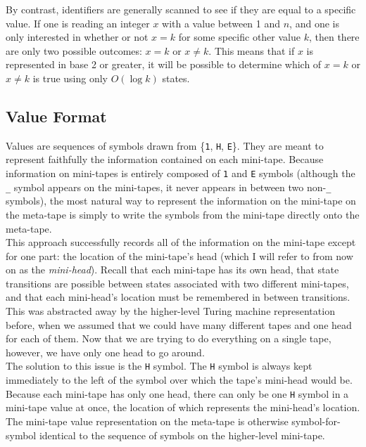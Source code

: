 \documentclass[11pt]{report}
\begin{document}
By contrast, identifiers are generally scanned to see if they are equal to a specific value. If one is reading an integer $x$ with a value between 1 and $n$, and one is only interested in whether or not $x = k$ for some specific other value $k$, then there are only two possible outcomes: $x = k$ or $x \not= k$. This means that if $x$ is represented in base 2 or greater, it will be possible to determine which of $x = k$ or $x \not= k$ is true using only $O(\log k)$ states. \\

\subsection{Value Format}

Values are sequences of symbols drawn from \{\texttt{1}, \texttt{H}, \texttt{E}\}. They are meant to represent faithfully the information contained on each mini-tape. Because information on mini-tapes is entirely composed of \texttt{1} and \texttt{E} symbols (although the \texttt{\_} symbol appears on the mini-tapes, it never appears in between two non-\texttt{\_} symbols), the most natural way to represent the information on the mini-tape on the meta-tape is simply to write the symbols from the mini-tape directly onto the meta-tape. \\

This approach successfully records all of the information on the mini-tape except for one part: the location of the mini-tape's head (which I will refer to from now on as the \emph{mini-head}). Recall that each mini-tape has its own head, that state transitions are possible between states associated with two different mini-tapes, and that each mini-head's location must be remembered in between transitions. This was abstracted away by the higher-level Turing machine representation before, when we assumed that we could have many different tapes and one head for each of them. Now that we are trying to do everything on a single tape, however, we have only one head to go around. \\

The solution to this issue is the \texttt{H} symbol. The \texttt{H} symbol is always kept immediately to the left of the symbol over which the tape's mini-head would be. Because each mini-tape has only one head, there can only be one \texttt{H} symbol in a mini-tape value at once, the location of which represents the mini-head's location. The mini-tape value representation on the meta-tape is otherwise symbol-for-symbol identical to the sequence of symbols on the higher-level mini-tape.
\end{document}
